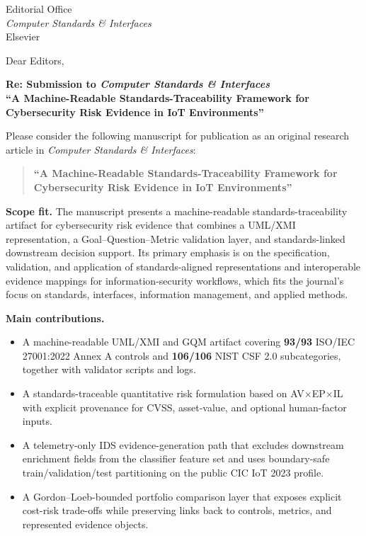 \documentclass[11pt]{letter}
\date{\today}
\begin{document}
\sloppy

\begin{letter}{
Editorial Office\\
\textit{Computer Standards \& Interfaces}\\
Elsevier}

\opening{Dear Editors,}

\textbf{Re: Submission to \textit{Computer Standards \& Interfaces}}\\
\textbf{``A Machine-Readable Standards-Traceability Framework for Cybersecurity Risk Evidence in IoT Environments''}

Please consider the following manuscript for publication as an original research article in \textit{Computer Standards \& Interfaces}:
\begin{quote}
\textbf{``A Machine-Readable Standards-Traceability Framework for Cybersecurity Risk Evidence in IoT Environments''}
\end{quote}

\textbf{Scope fit.} The manuscript presents a machine-readable standards-traceability artifact for cybersecurity risk evidence that combines a UML/XMI representation, a Goal--Question--Metric validation layer, and standards-linked downstream decision support. Its primary emphasis is on the specification, validation, and application of standards-aligned representations and interoperable evidence mappings for information-security workflows, which fits the journal's focus on standards, interfaces, information management, and applied methods.

\textbf{Main contributions.}
\begin{itemize}[leftmargin=*, nosep]
  \item A machine-readable UML/XMI and GQM artifact covering \textbf{93/93} ISO/IEC 27001:2022 Annex A controls and \textbf{106/106} NIST CSF 2.0 subcategories, together with validator scripts and logs.
  \item A standards-traceable quantitative risk formulation based on AV$\times$EP$\times$IL with explicit provenance for CVSS, asset-value, and optional human-factor inputs.
  \item A telemetry-only IDS evidence-generation path that excludes downstream enrichment fields from the classifier feature set and uses boundary-safe train/validation/test partitioning on the public CIC IoT 2023 profile.
  \item A Gordon--Loeb-bounded portfolio comparison layer that exposes explicit cost-risk trade-offs while preserving links back to controls, metrics, and represented evidence objects.
\end{itemize}


\end{letter}
\end{document}
